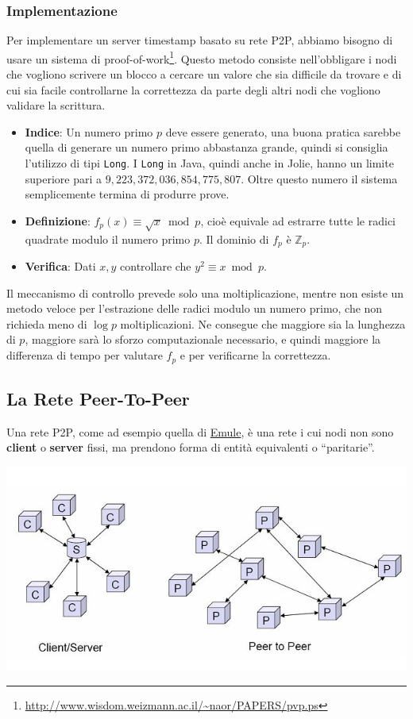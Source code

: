 \subsubsection{Implementazione}
Per implementare un server timestamp basato su rete P2P, abbiamo bisogno di usare un sistema di proof-of-work\footnote{\url{http://www.wisdom.weizmann.ac.il/~naor/PAPERS/pvp.ps}}. Questo metodo consiste nell'obbligare i nodi che vogliono scrivere un blocco a cercare un valore che sia difficile da trovare e di cui sia facile controllarne la correttezza da parte degli altri nodi che vogliono validare la scrittura.
%
\begin{itemize}
    \item \textbf{Indice}: Un numero primo $p$ deve essere generato, una buona pratica sarebbe quella di generare un numero primo abbastanza grande, quindi si consiglia l'utilizzo di tipi \texttt{Long}. I \texttt{Long} in Java, quindi anche in Jolie, hanno un limite superiore pari a $9,223,372,036,854,775,807$. Oltre questo numero il sistema semplicemente termina di produrre prove.
    \item \textbf{Definizione}: $f_p(x) \equiv \sqrt{x} \bmod p$, cioè equivale ad estrarre tutte le radici quadrate modulo il numero primo $p$. Il dominio di $f_p$ è $\mathbb{Z}_p$.
    \item \textbf{Verifica}:  Dati $x,y$ controllare che $y^2 \equiv x \bmod p$.
\end{itemize}
%
Il meccanismo di controllo prevede solo una moltiplicazione, mentre non esiste un metodo veloce per l'estrazione delle radici modulo un numero primo, che non richieda meno di $\log{p}$ moltiplicazioni. Ne consegue che maggiore sia la lunghezza di $p$, maggiore sarà lo sforzo computazionale necessario, e quindi maggiore la differenza di tempo per valutare $f_p$ e per verificarne la correttezza.


\subsection{La Rete Peer-To-Peer}
Una rete P2P, come ad esempio quella di \href{www.emule-project.net/home/perl/}{Emule}, è una rete i cui nodi non sono \textbf{client} o \textbf{server} fissi, ma prendono forma di entità equivalenti o ``paritarie''.
\begin{center}
    \includegraphics[width=\linewidth]{img/p2p}
\end{center}

